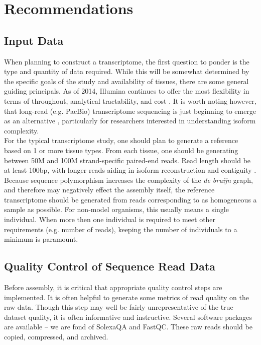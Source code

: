 \section*{Recommendations}

\subsection{Input Data}
When planning to construct a transcriptome, the first question to ponder is the type and quantity of data required. While this will be somewhat determined by the specific goals of the study and availability of tissues, there are some general guiding principals. As of 2014, Illumina continues to offer the most flexibility in terms of throughout, analytical tractability, and cost \citep{GLENN:2011gy}. It is worth noting however, that long-read (e.g. PacBio) transcriptome sequencing is just beginning to emerge as an alternative \citep{Au:2013hp}, particularly for researchers interested in understanding isoform complexity. \\

For the typical transcriptome study, one should plan to generate a reference based on 1 or more tissue types. From each tissue, one should be generating between 50M and 100M strand-specific paired-end reads. Read length should be at least 100bp, with longer reads aiding in isoform reconstruction and contiguity \citep{Garber:2011gp}. Because sequence polymorphism increases the complexity of the \textit{de bruijn} graph, and therefore may negatively effect the assembly itself, the reference transcriptome should be generated from reads corresponding to as homogeneous a sample as possible. For non-model organisms, this usually means a single individual. When more then one individual is required to meet other requirements (e.g. number of reads), keeping the number of individuals to a minimum is paramount. \\

\subsection{Quality Control of Sequence Read Data}
Before assembly, it is critical that appropriate quality control steps are implemented. It is often helpful to generate some metrics of read quality on the raw data. Though this step may well be fairly unrepresentative of the true dataset quality, it is often informative and instructive. Several software packages are available -- we are fond of SolexaQA and FastQC. These raw reads should be copied, compressed, and archived. \\


